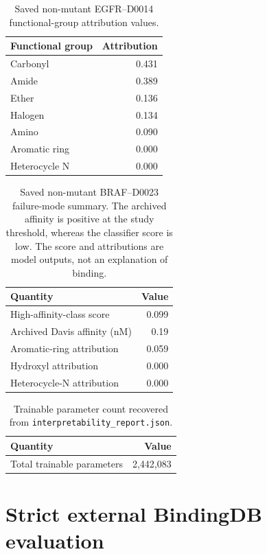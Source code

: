 \documentclass[11pt]{article}
\begin{document}
\begin{table}[H]
\centering
\caption{Saved non-mutant EGFR--D0014 functional-group attribution values.}
\begin{tabular}{lr}
\toprule
Functional group & Attribution \\
\midrule
Carbonyl & 0.431 \\
Amide & 0.389 \\
Ether & 0.136 \\
Halogen & 0.134 \\
Amino & 0.090 \\
Aromatic ring & 0.000 \\
Heterocycle N & 0.000 \\
\bottomrule
\end{tabular}
\end{table}

\begin{table}[H]
\centering
\caption{Saved non-mutant BRAF--D0023 failure-mode summary. The archived affinity is positive at the study threshold, whereas the classifier score is low. The score and attributions are model outputs, not an explanation of binding.}
\begin{tabular}{lr}
\toprule
Quantity & Value \\
\midrule
High-affinity-class score & 0.099 \\
Archived Davis affinity (nM) & 0.19 \\
Aromatic-ring attribution & 0.059 \\
Hydroxyl attribution & 0.000 \\
Heterocycle-N attribution & 0.000 \\
\bottomrule
\end{tabular}
\end{table}

\begin{table}[H]
\centering
\caption{Trainable parameter count recovered from \texttt{interpretability\_report.json}.}
\begin{tabular}{lr}
\toprule
Quantity & Value \\
\midrule
Total trainable parameters & 2,442,083 \\
\bottomrule
\end{tabular}
\end{table}

\clearpage
\section*{Strict external BindingDB evaluation}
\end{document}
